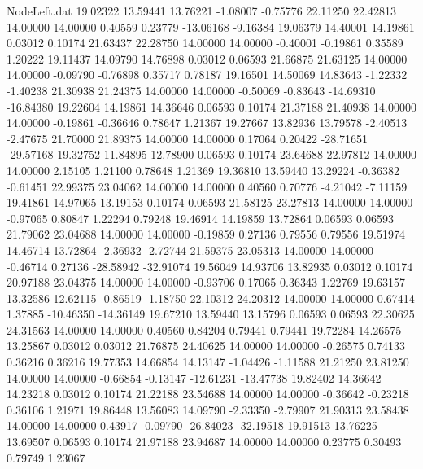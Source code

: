 \begin{filecontents}{NodeLeft.dat}
  19.02322   13.59441   13.76221    -1.08007   -0.75776   22.11250   22.42813   14.00000   14.00000    0.40559    0.23779  -13.06168   -9.16384
  19.06379   14.40001   14.19861     0.03012    0.10174   21.63437   22.28750   14.00000   14.00000   -0.40001   -0.19861    0.35589    1.20222
  19.11437   14.09790   14.76898     0.03012    0.06593   21.66875   21.63125   14.00000   14.00000   -0.09790   -0.76898    0.35717    0.78187
  19.16501   14.50069   14.83643    -1.22332   -1.40238   21.30938   21.24375   14.00000   14.00000   -0.50069   -0.83643  -14.69310  -16.84380
  19.22604   14.19861   14.36646     0.06593    0.10174   21.37188   21.40938   14.00000   14.00000   -0.19861   -0.36646    0.78647    1.21367
  19.27667   13.82936   13.79578    -2.40513   -2.47675   21.70000   21.89375   14.00000   14.00000    0.17064    0.20422  -28.71651  -29.57168
  19.32752   11.84895   12.78900     0.06593    0.10174   23.64688   22.97812   14.00000   14.00000    2.15105    1.21100    0.78648    1.21369
  19.36810   13.59440   13.29224    -0.36382   -0.61451   22.99375   23.04062   14.00000   14.00000    0.40560    0.70776   -4.21042   -7.11159
  19.41861   14.97065   13.19153     0.10174    0.06593   21.58125   23.27813   14.00000   14.00000   -0.97065    0.80847    1.22294    0.79248
  19.46914   14.19859   13.72864     0.06593    0.06593   21.79062   23.04688   14.00000   14.00000   -0.19859    0.27136    0.79556    0.79556
  19.51974   14.46714   13.72864    -2.36932   -2.72744   21.59375   23.05313   14.00000   14.00000   -0.46714    0.27136  -28.58942  -32.91074
  19.56049   14.93706   13.82935     0.03012    0.10174   20.97188   23.04375   14.00000   14.00000   -0.93706    0.17065    0.36343    1.22769
  19.63157   13.32586   12.62115    -0.86519   -1.18750   22.10312   24.20312   14.00000   14.00000    0.67414    1.37885  -10.46350  -14.36149
  19.67210   13.59440   13.15796     0.06593    0.06593   22.30625   24.31563   14.00000   14.00000    0.40560    0.84204    0.79441    0.79441
  19.72284   14.26575   13.25867     0.03012    0.03012   21.76875   24.40625   14.00000   14.00000   -0.26575    0.74133    0.36216    0.36216
  19.77353   14.66854   14.13147    -1.04426   -1.11588   21.21250   23.81250   14.00000   14.00000   -0.66854   -0.13147  -12.61231  -13.47738
  19.82402   14.36642   14.23218     0.03012    0.10174   21.22188   23.54688   14.00000   14.00000   -0.36642   -0.23218    0.36106    1.21971
  19.86448   13.56083   14.09790    -2.33350   -2.79907   21.90313   23.58438   14.00000   14.00000    0.43917   -0.09790  -26.84023  -32.19518
  19.91513   13.76225   13.69507     0.06593    0.10174   21.97188   23.94687   14.00000   14.00000    0.23775    0.30493    0.79749    1.23067

\end{filecontents}

